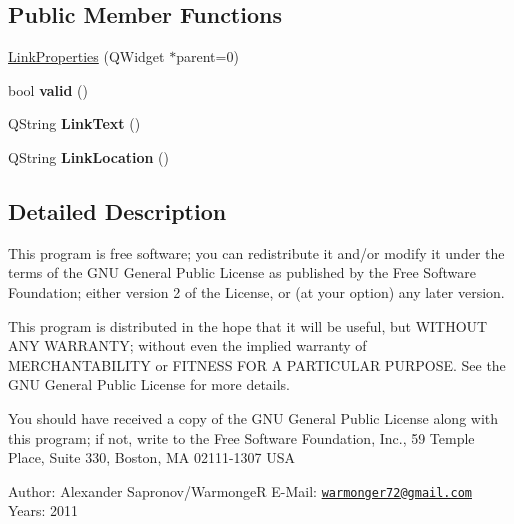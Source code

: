 \subsection*{Public Member Functions}
\begin{DoxyCompactItemize}
\item 
\hyperlink{classLinkProperties_a07ea16927b0341494b98bd90741899b7}{LinkProperties} (QWidget $\ast$parent=0)
\item 
\hypertarget{classLinkProperties_a80c4ebc3b1fddc5a59145f640f170d0f}{
bool {\bfseries valid} ()}
\label{classLinkProperties_a80c4ebc3b1fddc5a59145f640f170d0f}

\item 
\hypertarget{classLinkProperties_a9d0093500fde025d37d42b694b83d5ed}{
QString {\bfseries LinkText} ()}
\label{classLinkProperties_a9d0093500fde025d37d42b694b83d5ed}

\item 
\hypertarget{classLinkProperties_a03cbc959779edb7be7540a808d3fc3e8}{
QString {\bfseries LinkLocation} ()}
\label{classLinkProperties_a03cbc959779edb7be7540a808d3fc3e8}

\end{DoxyCompactItemize}


\subsection{Detailed Description}
This program is free software; you can redistribute it and/or modify it under the terms of the GNU General Public License as published by the Free Software Foundation; either version 2 of the License, or (at your option) any later version.

This program is distributed in the hope that it will be useful, but WITHOUT ANY WARRANTY; without even the implied warranty of MERCHANTABILITY or FITNESS FOR A PARTICULAR PURPOSE. See the GNU General Public License for more details.

You should have received a copy of the GNU General Public License along with this program; if not, write to the Free Software Foundation, Inc., 59 Temple Place, Suite 330, Boston, MA 02111-\/1307 USA

Author: Alexander Sapronov/WarmongeR E-\/Mail: \href{mailto:warmonger72@gmail.com}{\tt warmonger72@gmail.com} Years: 2011 

